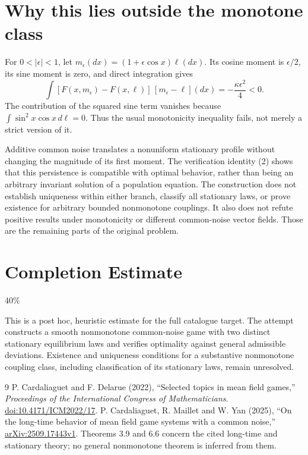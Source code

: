 \documentclass[11pt,a4paper]{article}
\theoremstyle{remark}
\begin{document}
\section{Why this lies outside the monotone class}
For $0<|\epsilon|<1$, let $m_\epsilon(dx)=(1+\epsilon\cos x)\ell(dx)$. Its cosine moment is $\epsilon/2$, its sine moment is zero, and direct integration gives
\[
 \int [F(x,m_\epsilon)-F(x,\ell)]\,[m_\epsilon-\ell](dx)
 =-\frac{\kappa\epsilon^2}{4}<0.
\]
The contribution of the squared sine term vanishes because $\int\sin^2x\cos x\,d\ell=0$. Thus the usual monotonicity inequality fails, not merely a strict version of it.

Additive common noise translates a nonuniform stationary profile without changing the magnitude of its first moment. The verification identity (2) shows that this persistence is compatible with optimal behavior, rather than being an arbitrary invariant solution of a population equation. The construction does not establish uniqueness within either branch, classify all stationary laws, or prove existence for arbitrary bounded nonmonotone couplings. It also does not refute positive results under monotonicity or different common-noise vector fields. Those are the remaining parts of the original problem.

\section{Completion Estimate}
40\%

This is a post hoc, heuristic estimate for the full catalogue target.
The attempt constructs a smooth nonmonotone common-noise game with two distinct stationary equilibrium laws and verifies optimality against general admissible deviations. Existence and uniqueness conditions for a substantive nonmonotone coupling class, including classification of its stationary laws, remain unresolved.

\begin{thebibliography}{9}
 P. Cardaliaguet and F. Delarue (2022), ``Selected topics in mean field games,'' \emph{Proceedings of the International Congress of Mathematicians}. \href{https://doi.org/10.4171/ICM2022/17}{doi:10.4171/ICM2022/17}.
 P. Cardaliaguet, R. Maillet and W. Yan (2025), ``On the long-time behavior of mean field game systems with a common noise,'' \href{https://arxiv.org/abs/2509.17443v1}{arXiv:2509.17443v1}. Theorems 3.9 and 6.6 concern the cited long-time and stationary theory; no general nonmonotone theorem is inferred from them.
\end{thebibliography}
\end{document}
